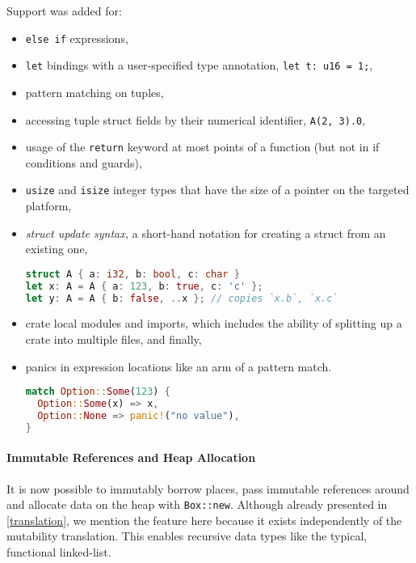 Support was added for:

\begin{itemize}
\item
  \passthrough{\lstinline!else if!} expressions,
\item
  \passthrough{\lstinline!let!} bindings with a user-specified type
  annotation, \passthrough{\lstinline!let t: u16 = 1;!},
\item
  pattern matching on tuples,
\item
  accessing tuple struct fields by their numerical identifier,
  \passthrough{\lstinline!A(2, 3).0!},
\item
  usage of the \passthrough{\lstinline!return!} keyword at most points
  of a function (but not in if conditions and guards),
\item
  \passthrough{\lstinline!usize!} and \passthrough{\lstinline!isize!}
  integer types that have the size of a pointer on the targeted
  platform,
\item
  \emph{struct update syntax,} a short-hand notation for creating a
  struct from an existing one,

\begin{lstlisting}[language=Rust]
struct A { a: i32, b: bool, c: char }
let x: A = A { a: 123, b: true, c: 'c' };
let y: A = A { b: false, ..x }; // copies `x.b`, `x.c`
\end{lstlisting}
\item
  crate local modules and imports, which includes the ability of
  splitting up a crate into multiple files, and finally,
\item
  panics in expression locations like an arm of a pattern match.

\begin{lstlisting}[language=Rust]
match Option::Some(123) {
  Option::Some(x) => x,
  Option::None => panic!("no value"),
}
\end{lstlisting}
\end{itemize}

\paragraph{Immutable References and Heap Allocation}

It is now possible to immutably borrow places, pass immutable references
around and allocate data on the heap with
\passthrough{\lstinline!Box::new!}. Although already presented in
\autoref{translation}, we mention the feature here because it exists
independently of the mutability translation. This enables recursive data
types like the typical, functional linked-list.

